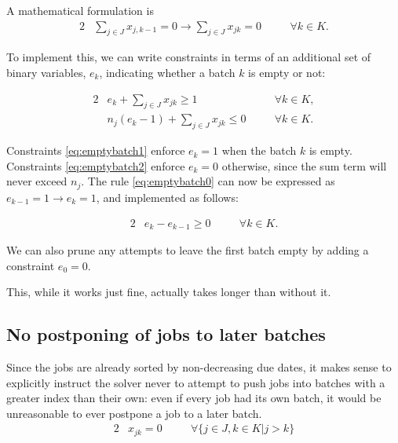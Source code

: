 

A mathematical formulation is
\begin{alignat}{2}
& \sum_{j \in J} x_{j,k-1} = 0 \rightarrow \sum_{j \in J} x_{jk} = 0 \quad && \forall k \in K. \label{eq:emptybatch0}
\end{alignat}

To implement this, we can write constraints in terms of an additional  set of binary variables, $e_k$, indicating whether a batch $k$ is empty or not:

\begin{alignat}{2}
& e_k + \sum_{j \in J} x_{jk} \geq 1 \quad && \forall k \in K, \label{eq:emptybatch1} \\
& n_j (e_k-1) + \sum_{j \in J} x_{jk} \leq 0 \quad && \forall k \in K. \label{eq:emptybatch2}
\end{alignat}

Constraints \eqref{eq:emptybatch1} enforce $e_k = 1$ when the batch $k$ is
empty. Constraints \eqref{eq:emptybatch2} enforce $e_k = 0$ otherwise, since the sum term will never exceed $n_j$. The rule \ref{eq:emptybatch0} can now be expressed as $e_{k-1} = 1 \rightarrow e_k = 1$, and implemented as follows:

\begin{alignat}{2}
& e_k - e_{k-1} \geq 0 \quad && \forall k \in K.
\end{alignat}

We can also prune any attempts to leave the first batch empty by adding a constraint $e_0 = 0$.

{\color{darkred} This, while it works just fine, actually takes longer than without it.}

\subsection{No postponing of jobs to later batches}
Since the jobs are already sorted by non-decreasing due dates, it makes sense to explicitly instruct the solver never to attempt to push jobs into batches with a greater index than their own: even if every job had its own batch, it would be unreasonable to ever postpone a job to a later batch.
\begin{alignat}{2}
  & x_{jk} = 0 \quad && \forall \{j \in J, k \in K | j > k \}
\end{alignat}


